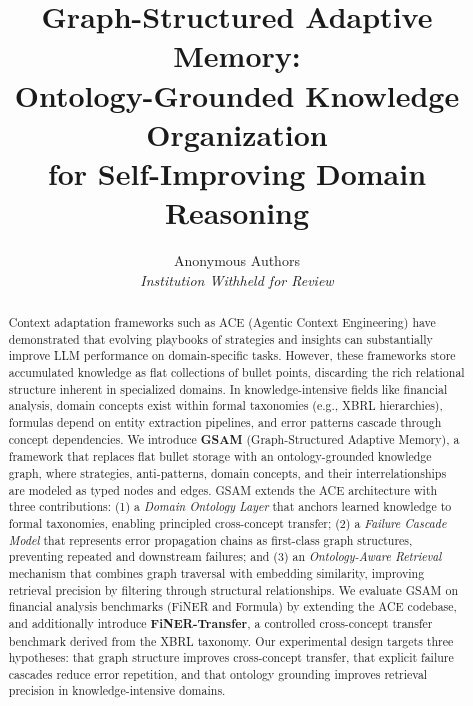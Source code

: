 \documentclass[12pt,a4paper]{article}
\begin{document}
\title{\textbf{Graph-Structured Adaptive Memory:\\Ontology-Grounded Knowledge Organization\\for Self-Improving Domain Reasoning}}

\author{
Anonymous Authors \\
\textit{Institution Withheld for Review}
}

\date{}

\maketitle

\begin{abstract}
Context adaptation frameworks such as ACE (Agentic Context Engineering) have demonstrated that evolving playbooks of strategies and insights can substantially improve LLM performance on domain-specific tasks. However, these frameworks store accumulated knowledge as flat collections of bullet points, discarding the rich relational structure inherent in specialized domains. In knowledge-intensive fields like financial analysis, domain concepts exist within formal taxonomies (e.g., XBRL hierarchies), formulas depend on entity extraction pipelines, and error patterns cascade through concept dependencies. We introduce \textbf{GSAM} (Graph-Structured Adaptive Memory), a framework that replaces flat bullet storage with an ontology-grounded knowledge graph, where strategies, anti-patterns, domain concepts, and their interrelationships are modeled as typed nodes and edges. GSAM extends the ACE architecture with three contributions: (1) a \textit{Domain Ontology Layer} that anchors learned knowledge to formal taxonomies, enabling principled cross-concept transfer; (2) a \textit{Failure Cascade Model} that represents error propagation chains as first-class graph structures, preventing repeated and downstream failures; and (3) an \textit{Ontology-Aware Retrieval} mechanism that combines graph traversal with embedding similarity, improving retrieval precision by filtering through structural relationships. We evaluate GSAM on financial analysis benchmarks (FiNER and Formula) by extending the ACE codebase, and additionally introduce \textbf{FiNER-Transfer}, a controlled cross-concept transfer benchmark derived from the XBRL taxonomy. Our experimental design targets three hypotheses: that graph structure improves cross-concept transfer, that explicit failure cascades reduce error repetition, and that ontology grounding improves retrieval precision in knowledge-intensive domains.
\end{abstract}
\end{document}
